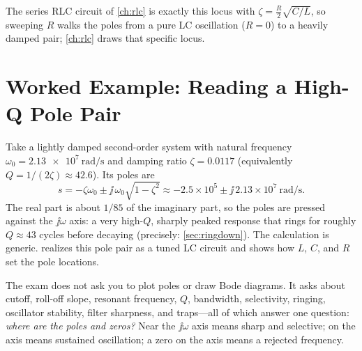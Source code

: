 The series RLC circuit of \cref{ch:rlc} is exactly this locus with
\(\zeta=\tfrac{R}{2}\sqrt{C/L}\), so sweeping \(R\) walks the poles from a pure
LC oscillation (\(R=0\)) to a heavily damped pair; \cref{ch:rlc} draws that
specific locus.

\section{Worked Example: Reading a High-Q Pole Pair}
Take a lightly damped second-order system with natural frequency
\(\omega_0=\SI{2.13e7}{\radian\per\second}\) and damping ratio \(\zeta=0.0117\)
(equivalently \(Q=1/(2\zeta)\approx42.6\)). Its poles are
\[
s=-\zeta\omega_0\pm\jj\,\omega_0\sqrt{1-\zeta^2}
\approx-2.5\times10^{5}\pm\jj\,2.13\times10^{7}\ \si{\radian\per\second}.
\]
The real part is about \(1/85\) of the imaginary part, so the poles are pressed
against the \(\jj\omega\) axis: a very high-\(Q\), sharply peaked response that
rings for roughly \(Q\approx43\) cycles before decaying (precisely:
\cref{sec:ringdown}). The calculation is generic.  realizes this
pole pair as a tuned LC circuit and shows how \(L\), \(C\), and \(R\) set the
pole locations.

\begin{exambox}
The exam does not ask you to plot poles or draw Bode diagrams. It asks about
cutoff, roll-off slope, resonant frequency, \(Q\), bandwidth, selectivity,
ringing, oscillator stability, filter sharpness, and traps---all of which answer
one question: \emph{where are the poles and zeros?} Near the \(\jj\omega\) axis
means sharp and selective; on the axis means sustained oscillation; a zero on the
axis means a rejected frequency.
\end{exambox}
